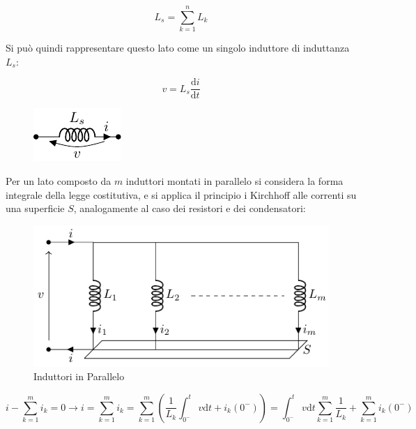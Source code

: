 \documentclass{article}
\newcommand{\df}{\mathrm{d}}
\numberwithin{equation}{subsection}
\begin{document}
\begin{equation*}
    L_s=\displaystyle\sum_{k=1}^nL_k
\end{equation*}

Si può quindi rappresentare questo lato come un singolo induttore di induttanza $L_s$:

\begin{equation}
    v=L_s\displaystyle\frac{\df i}{\df t}
\end{equation}

\begin{figure}[H]%
    \centering
    \includegraphics{induttore-serie-equivalente.pdf}
    \label{fig:induttore-serie-equivalente}
\end{figure}



Per un lato composto da $m$ induttori montati in parallelo si considera la forma integrale della legge costitutiva, e si applica il principio i Kirchhoff alle correnti su una 
superficie $S$, analogamente al caso dei resistori e dei condensatori:

\begin{figure}[H]%
    \centering
    \includegraphics{induttore-parallelo.pdf}%
    \caption{Induttori in Parallelo}
    \label{fig:induttore-parallelo}
\end{figure}

\begin{equation*}
    i-\displaystyle\sum_{k=1}^mi_k=0\to i=\sum_{k=1}^mi_k=\sum_{k=1}^m\left(\frac{1}{L_k}\int_{0^-}^t v\df t+i_k(0^-)\right)=\int_{0^-}^t v\df t\sum_{k=1}^m\frac{1}{L_k}+\sum_{k=1}^mi_k(0^-)
\end{equation*}
\end{document}
